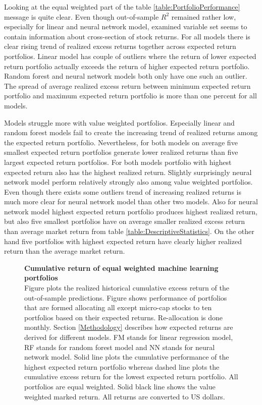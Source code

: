 \documentclass{article}
\begin{document}
Looking at the equal weighted part of the table \ref{table:PortfolioPerformance} message is quite clear. Even though out-of-sample $R^2$ remained rather low, especially for linear and neural network model, examined variable set seems to contain information about cross-section of stock returns. For all models there is clear rising trend of realized excess returns together across expected return portfolios. Linear model has couple of outliers where the return of lower expected return portfolio actually exceeds the return of higher expected return portfolio. Random forest and neural network models both only have one such an outlier. The spread of average realized excess return between minimum expected return portfolio and maximum expected return portfolio is more than one percent for all models.  \par

Models struggle more with value weighted portfolios. Especially linear and random forest models fail to create the increasing trend of realized returns among the expected return portfolio. Nevertheless, for both models on average five smallest expected return portfolios generate lower realized returns than five largest expected return portfolios. For both models portfolio with highest expected return also has the highest realized return. Slightly surprisingly neural network model perform relatively strongly also among value weighted portfolios. Even though there exists some outliers trend of increasing realized returns is much more clear for neural network model than other two models. Also for neural network model highest expected return portfolio produces highest realized return, but also five smallest portfolios have on average smaller realized excess return than average market return from table \ref{table:DescriptiveStatistics}. On the other hand five portfolios with highest expected return have clearly higher realized return than the average market return. \par

\begin{figure}[h]
\centering
\caption[Cumulative return of equal weighted machine learning portfolios]{\textbf{Cumulative return of equal weighted machine learning portfolios}\\ Figure plots the realized historical cumulative excess return of the out-of-sample predictions. Figure shows performance of portfolios that are formed allocating all except micro-cap stocks to ten portfolios based on their expected returns. Re-allocation is done monthly. Section \ref{Methodology} describes how expected returns are derived for different models. FM stands for linear regression model, RF stands for random forest model and NN stands for neural network model. Solid line plots the cumulative performance of the highest expected return portfolio whereas dashed line plots the cumulative excess return for the lowest expected return portfolio. All portfolios are equal weighted. Solid black line shows the value weighted marked return. All returns are converted to US dollars.}

\label{plot:cumul_ew_portf_return}
\end{figure}
\end{document}
